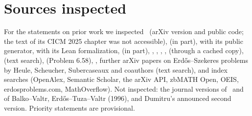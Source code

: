 \documentclass[11pt]{article}
\theoremstyle{remark}
\begin{document}
\section{Sources inspected}\label{sec:lit}
For the statements on prior work we inspected~\cite{SMQH25} (arXiv version and public code; the text of its CICM 2025
chapter was not accessible), \cite{Mac25} (in part), \cite{Dum25} with its public generator, \cite{Bae25} with its Lean
formalization, \cite{BB25} (in part), \cite{BV15}, \cite{MS00}, \cite{ES61}, \cite{KPH26}, \cite{ZLRO26} (through a cached
copy), \cite{Sch26} (text search), \cite{GGTW25} (Problem 6.58), \cite{KK26}, further arXiv papers on Erd\H{o}s--Szekeres
problems by Heule, Scheucher, Subercaseaux and coauthors (text search), and index searches (OpenAlex, Semantic Scholar,
the arXiv API, zbMATH Open, OEIS, erdosproblems.com, MathOverflow). Not inspected: the journal versions of~\cite{BB25}
and of Balko--Valtr, Erd\H{o}s--Tuza--Valtr (1996), and Dumitru's announced second version. Priority statements are
provisional.
\end{document}
